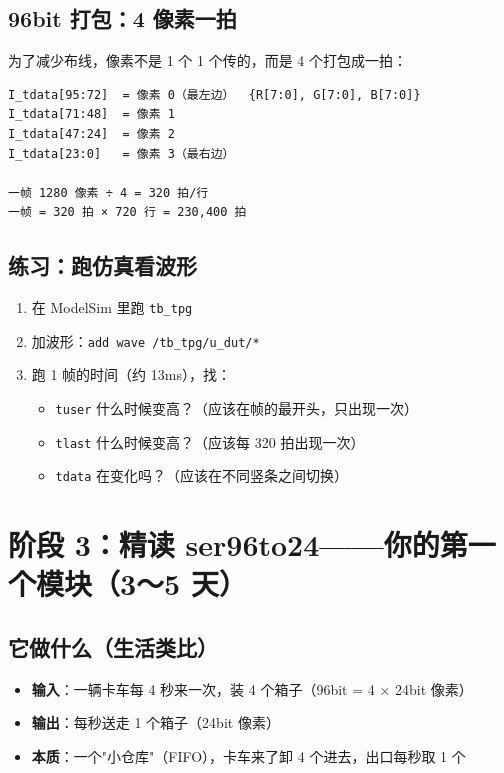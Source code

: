 \documentclass[11pt]{ctexart}
\begin{document}
\subsection{96bit 打包：4 像素一拍}

为了减少布线，像素不是 1 个 1 个传的，而是 4 个打包成一拍：

\begin{Verbatim}[frame=single,fontsize=\small]
I_tdata[95:72]  = 像素 0（最左边）  {R[7:0], G[7:0], B[7:0]}
I_tdata[71:48]  = 像素 1
I_tdata[47:24]  = 像素 2
I_tdata[23:0]   = 像素 3（最右边）

一帧 1280 像素 ÷ 4 = 320 拍/行
一帧 = 320 拍 × 720 行 = 230,400 拍
\end{Verbatim}

\subsection{练习：跑仿真看波形}

\begin{enumerate}
  \item 在 ModelSim 里跑 \texttt{tb\_tpg}
  \item 加波形：\texttt{add wave /tb\_tpg/u\_dut/*}
  \item 跑 1 帧的时间（约 13ms），找：
  \begin{itemize}
    \item \texttt{tuser} 什么时候变高？（应该在帧的最开头，只出现一次）
    \item \texttt{tlast} 什么时候变高？（应该每 320 拍出现一次）
    \item \texttt{tdata} 在变化吗？（应该在不同竖条之间切换）
  \end{itemize}
\end{enumerate}

\section{阶段 3：精读 ser96to24——你的第一个模块（3～5 天）}

\subsection{它做什么（生活类比）}

\begin{itemize}
  \item \textbf{输入}：一辆卡车每 4 秒来一次，装 4 个箱子（96bit = 4 × 24bit 像素）
  \item \textbf{输出}：每秒送走 1 个箱子（24bit 像素）
  \item \textbf{本质}：一个"小仓库"（FIFO），卡车来了卸 4 个进去，出口每秒取 1 个
\end{itemize}
\end{document}
